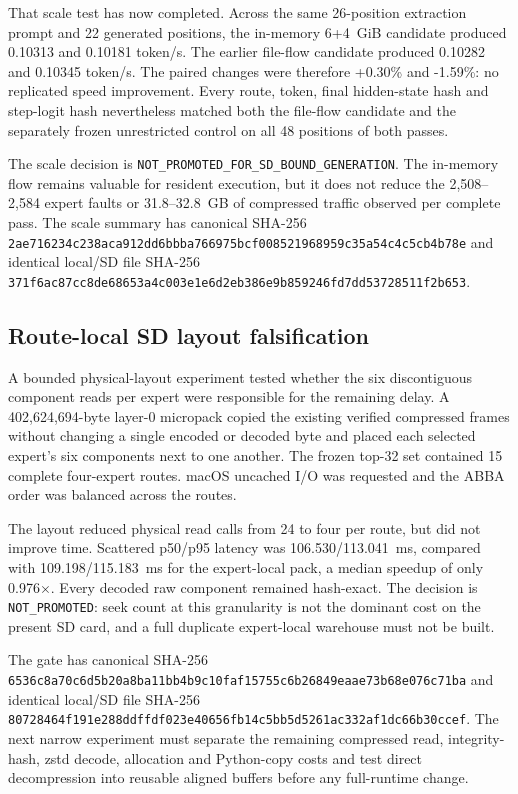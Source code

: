 That scale test has now completed.  Across the same 26-position extraction
prompt and 22 generated positions, the in-memory 6+4~GiB candidate produced
0.10313 and 0.10181 token/s.  The earlier file-flow candidate produced 0.10282
and 0.10345 token/s.  The paired changes were therefore +0.30\% and -1.59\%:
no replicated speed improvement.  Every route, token, final hidden-state hash
and step-logit hash nevertheless matched both the file-flow candidate and the
separately frozen unrestricted control on all 48 positions of both passes.

The scale decision is
\texttt{NOT\_PROMOTED\_FOR\_SD\_BOUND\_GENERATION}.  The in-memory flow remains
valuable for resident execution, but it does not reduce the 2,508--2,584
expert faults or 31.8--32.8~GB of compressed traffic observed per complete
pass.  The scale summary has canonical SHA-256
\texttt{2ae716234c238aca912dd6bbba766975bcf008521968959c35a54c4c5cb4b78e}
and identical local/SD file SHA-256
\texttt{371f6ac87cc8de68653a4c003e1e6d2eb386e9b859246fd7dd53728511f2b653}.

\subsection{Route-local SD layout falsification}

A bounded physical-layout experiment tested whether the six discontiguous
component reads per expert were responsible for the remaining delay.  A
402,624,694-byte layer-0 micropack copied the existing verified compressed
frames without changing a single encoded or decoded byte and placed each
selected expert's six components next to one another.  The frozen top-32 set
contained 15 complete four-expert routes.  macOS uncached I/O was requested and
the ABBA order was balanced across the routes.

The layout reduced physical read calls from 24 to four per route, but did not
improve time.  Scattered p50/p95 latency was 106.530/113.041~ms, compared with
109.198/115.183~ms for the expert-local pack, a median speedup of only
0.976$\times$.  Every decoded raw component remained hash-exact.  The decision
is \texttt{NOT\_PROMOTED}: seek count at this granularity is not the dominant
cost on the present SD card, and a full duplicate expert-local warehouse must
not be built.

The gate has canonical SHA-256
\texttt{6536c8a70c6d5b20a8ba11bb4b9c10faf15755c6b26849eaae73b68e076c71ba}
and identical local/SD file SHA-256
\texttt{80728464f191e288ddffdf023e40656fb14c5bb5d5261ac332af1dc66b30ccef}.
The next narrow experiment must separate the remaining compressed read,
integrity-hash, zstd decode, allocation and Python-copy costs and test direct
decompression into reusable aligned buffers before any full-runtime change.

